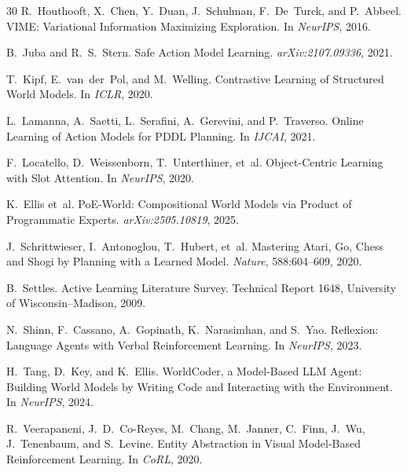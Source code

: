 \documentclass{article}
\begin{document}
\begin{thebibliography}{30}
R.~Houthooft, X.~Chen, Y.~Duan, J.~Schulman, F.~De~Turck, and P.~Abbeel.
\newblock VIME: Variational Information Maximizing Exploration.
\newblock In \emph{NeurIPS}, 2016.

B.~Juba and R.~S.~Stern.
\newblock Safe Action Model Learning.
\newblock \emph{arXiv:2107.09336}, 2021.

T.~Kipf, E.~van~der~Pol, and M.~Welling.
\newblock Contrastive Learning of Structured World Models.
\newblock In \emph{ICLR}, 2020.

L.~Lamanna, A.~Saetti, L.~Serafini, A.~Gerevini, and P.~Traverso.
\newblock Online Learning of Action Models for PDDL Planning.
\newblock In \emph{IJCAI}, 2021.

F.~Locatello, D.~Weissenborn, T.~Unterthiner, et~al.
\newblock Object-Centric Learning with Slot Attention.
\newblock In \emph{NeurIPS}, 2020.

K.~Ellis et~al.
\newblock PoE-World: Compositional World Models via Product of Programmatic
  Experts.
\newblock \emph{arXiv:2505.10819}, 2025.

J.~Schrittwieser, I.~Antonoglou, T.~Hubert, et~al.
\newblock Mastering Atari, Go, Chess and Shogi by Planning with a Learned Model.
\newblock \emph{Nature}, 588:604--609, 2020.

B.~Settles.
\newblock Active Learning Literature Survey.
\newblock Technical Report 1648, University of Wisconsin--Madison, 2009.

N.~Shinn, F.~Cassano, A.~Gopinath, K.~Narasimhan, and S.~Yao.
\newblock Reflexion: Language Agents with Verbal Reinforcement Learning.
\newblock In \emph{NeurIPS}, 2023.

H.~Tang, D.~Key, and K.~Ellis.
\newblock WorldCoder, a Model-Based LLM Agent: Building World Models by Writing
  Code and Interacting with the Environment.
\newblock In \emph{NeurIPS}, 2024.

R.~Veerapaneni, J.~D.~Co-Reyes, M.~Chang, M.~Janner, C.~Finn, J.~Wu,
  J.~Tenenbaum, and S.~Levine.
\newblock Entity Abstraction in Visual Model-Based Reinforcement Learning.
\newblock In \emph{CoRL}, 2020.

\end{thebibliography}
\end{document}
